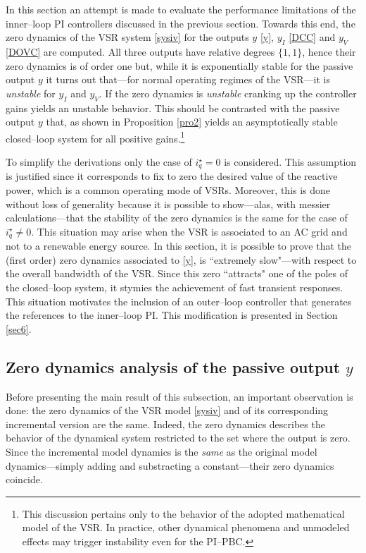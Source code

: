 \documentclass[5p,twocolumn]{elsarticle}
\numberwithin{equation}{section}
\begin{document}
In this section an attempt is made to evaluate the performance limitations of the inner--loop PI controllers discussed in the previous section. Towards this end, the zero dynamics of the VSR system
\eqref{sysiv} for the outputs $y$ \eqref{y}, $y_I$ \eqref{DCC} and $y_V$ \eqref{DOVC} are computed. All three outputs have relative degrees $\{1,1\}$, hence their zero dynamics is of order one but, while it is
exponentially stable for the passive output $y$ it turns out that---for normal operating regimes of the VSR---it is {\em unstable} for $y_I$ and $y_V$. If the {zero dynamics} is {\em unstable} cranking up the
controller gains yields an unstable behavior. This should be contrasted with the passive output $y$ that, as shown in Proposition \ref{pro2} yields an asymptotically stable closed--loop system for all positive
gains.\footnote{This discussion pertains only to the behavior of the adopted mathematical model of the VSR. In practice, other dynamical phenomena and unmodeled effects may trigger instability even for the
PI--PBC.}

To simplify the derivations only the case of $i_q^\star =0$ is considered. This assumption is justified since it corresponds to fix to zero the desired value of the reactive power, which is a common operating
mode of VSRs. Moreover, this is done without loss of generality because it is possible to show---alas, with messier calculations---that the stability of the zero dynamics is the same for the case of $i_q^\star
\neq 0$. This situation may arise when the VSR is associated to an AC grid and not to a renewable energy source. In this section, it is possible to prove that the (first order) zero dynamics associated to \eqref{y}, is ``extremely slow"---with respect to the overall bandwidth of the VSR. Since this zero ``attracts" one of the poles
of the closed--loop system, it stymies the achievement of fast transient responses. This situation motivates the inclusion of an outer--loop controller that generates the references to the inner--loop
PI. This modification is presented in Section \ref{sec6}.
\subsection{Zero dynamics analysis of the passive output $y$}
\label{zerdyn}
Before presenting the main result of this subsection, an important observation is done: the zero dynamics of the VSR model \eqref{sysiv} and of its corresponding incremental version are the same. Indeed,
the zero dynamics describes the behavior of the dynamical system restricted to the set where the output is zero. Since the incremental model dynamics is the {\em same} as the original model dynamics---simply
adding and substracting a constant---their zero dynamics coincide.
\end{document}
